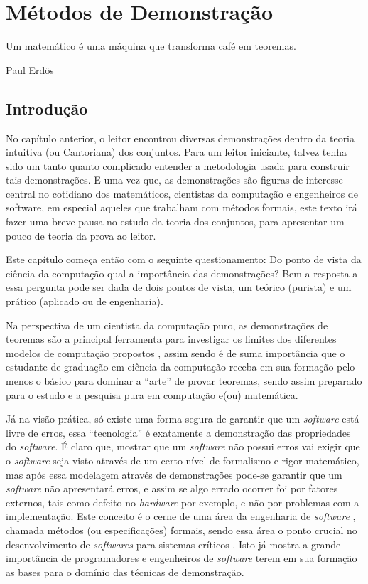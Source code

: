 \chapter{Métodos de Demonstração}\label{cap:Demonstracoes}


\epigraph{Um matemático é uma máquina que transforma café em teoremas.}{Paul Erdös}

\section{Introdução}\label{sec:Introducao-Demonstracoes}

No capítulo anterior, o leitor encontrou diversas demonstrações dentro da teoria intuitiva (ou Cantoriana) dos conjuntos. Para um leitor iniciante, talvez tenha sido um tanto quanto complicado entender a metodologia usada para construir tais demonstrações. E uma vez que, as demonstrações são figuras de interesse central no cotidiano dos matemáticos, cientistas da computação e engenheiros de software, em especial aqueles que trabalham com métodos formais, este texto irá fazer uma breve pausa no estudo da teoria dos conjuntos, para apresentar um pouco de teoria da prova ao leitor.

Este capítulo começa então com o seguinte questionamento: Do ponto de vista da ciência da computação qual a importância das demonstrações? Bem a resposta a essa pergunta pode ser dada de dois pontos de vista,  um teórico (purista) e um prático (aplicado ou de engenharia).

Na perspectiva de um cientista da computação puro, as demonstrações de teoremas são a principal ferramenta para investigar os limites dos diferentes modelos de computação propostos \cite{hopcroft2008, linz2006}, assim sendo é de suma importância que o estudante de graduação em ciência da computação receba em sua formação pelo menos o básico para dominar a ``arte'' de provar teoremas, sendo assim preparado para o estudo e a pesquisa pura em computação e(ou) matemática.

Já na visão prática, só existe uma forma segura de garantir que um \textit{software} está livre de erros, essa ``tecnologia'' é exatamente a demonstração das propriedades do \textit{software}. É claro que, mostrar que um \textit{software} não possui erros vai exigir que o \textit{software} seja visto através de um certo nível de formalismo e rigor matemático, mas após essa modelagem através de demonstrações pode-se garantir que um \textit{software} não apresentará erros, e assim se algo errado ocorrer foi por fatores externos, tais como defeito no \textit{hardware} por exemplo, e não por problemas com a implementação. Este conceito é o cerne de uma área da engenharia de \textit{software} \cite{pressman2016}, chamada métodos  (ou especificações) formais, sendo essa área o ponto crucial no desenvolvimento de \textit{softwares} para sistemas críticos \cite{sommerville2011}. Isto já mostra a grande importância de programadores e engenheiros de \textit{software} terem em sua formação as bases para o domínio das técnicas de demonstração.

